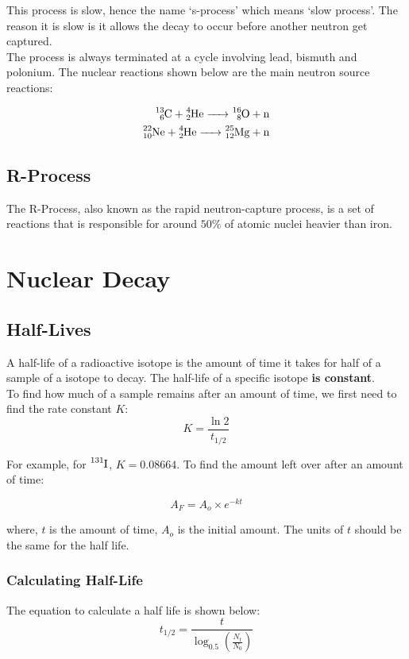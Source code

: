 \documentclass{article}
\begin{document}
\begin{multicols*}{2}
    This process is slow, hence the name `s-process' which means `slow process'.
    The reason it is slow is it allows the decay to occur before another neutron
    get captured.\\

    The process is always terminated at a cycle involving lead, bismuth and
    polonium. The nuclear reactions shown below are the main neutron source
    reactions:

    \begin{equation*}
      \begin{split}
        \ce{^{13}_{6}C + ^{4}_{2}He -> ^{16}_{8}O + n} \\
        \ce{^{22}_{10}Ne + ^{4}_{2}He -> ^{25}_{12}Mg + n}
      \end{split}
    \end{equation*}
    
    \subsection{R-Process}
    The R-Process, also known as the rapid neutron-capture process, is a set
    of reactions that is responsible for around $50\%$ of atomic nuclei heavier
    than iron.

    \section{Nuclear Decay}
    \subsection{Half-Lives}
    A half-life of a radioactive isotope is the amount of time it takes for
    half of a sample of a isotope to decay. The half-life of a specific
    isotope \textbf{is constant}.\\

    To find how much of a sample remains after an amount of time, we first
    need to find the rate constant $K$:
    \[
      K = \frac{\ln 2}{t_{1/2}}
    \]

    For example, for $\ce{^{131}I}$, $K=0.08664$. To find the amount left
    over after an amount of time:

    \[
      A_F = A_o \times e^{-kt}
    \]

    where, $t$ is the amount of time, $A_o$ is the initial amount. The units
    of $t$ should be the same for the half life.

    \subsubsection{Calculating Half-Life}
    The equation to calculate a half life is shown below:
    \[
      t_{1/2} = \frac{t}{ \log_{0.5}\left( \frac{N_t}{N_0} \right) }
    \]


\end{multicols*}
\end{document}
